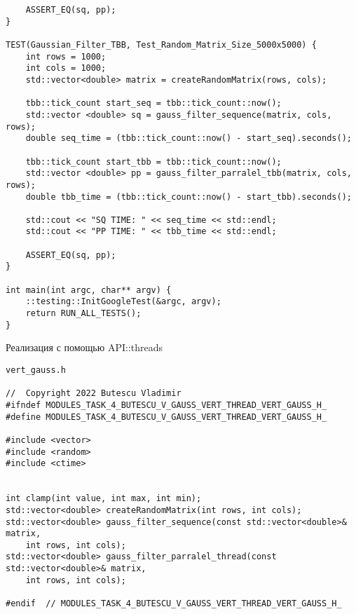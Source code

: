 \documentclass{report}
\begin{document}
\begin{lstlisting}
    ASSERT_EQ(sq, pp);
}

TEST(Gaussian_Filter_TBB, Test_Random_Matrix_Size_5000x5000) {
    int rows = 1000;
    int cols = 1000;
    std::vector<double> matrix = createRandomMatrix(rows, cols);

    tbb::tick_count start_seq = tbb::tick_count::now();
    std::vector <double> sq = gauss_filter_sequence(matrix, cols, rows);
    double seq_time = (tbb::tick_count::now() - start_seq).seconds();

    tbb::tick_count start_tbb = tbb::tick_count::now();
    std::vector <double> pp = gauss_filter_parralel_tbb(matrix, cols, rows);
    double tbb_time = (tbb::tick_count::now() - start_tbb).seconds();

    std::cout << "SQ TIME: " << seq_time << std::endl;
    std::cout << "PP TIME: " << tbb_time << std::endl;

    ASSERT_EQ(sq, pp);
}

int main(int argc, char** argv) {
    ::testing::InitGoogleTest(&argc, argv);
    return RUN_ALL_TESTS();
}
\end{lstlisting}
Реализация с помощью API::threads
\begin{lstlisting}
vert_gauss.h

//  Copyright 2022 Butescu Vladimir
#ifndef MODULES_TASK_4_BUTESCU_V_GAUSS_VERT_THREAD_VERT_GAUSS_H_
#define MODULES_TASK_4_BUTESCU_V_GAUSS_VERT_THREAD_VERT_GAUSS_H_

#include <vector>
#include <random>
#include <ctime>


int clamp(int value, int max, int min);
std::vector<double> createRandomMatrix(int rows, int cols);
std::vector<double> gauss_filter_sequence(const std::vector<double>& matrix,
    int rows, int cols);
std::vector<double> gauss_filter_parralel_thread(const std::vector<double>& matrix,
    int rows, int cols);

#endif  // MODULES_TASK_4_BUTESCU_V_GAUSS_VERT_THREAD_VERT_GAUSS_H_
\end{lstlisting}
\end{document}
